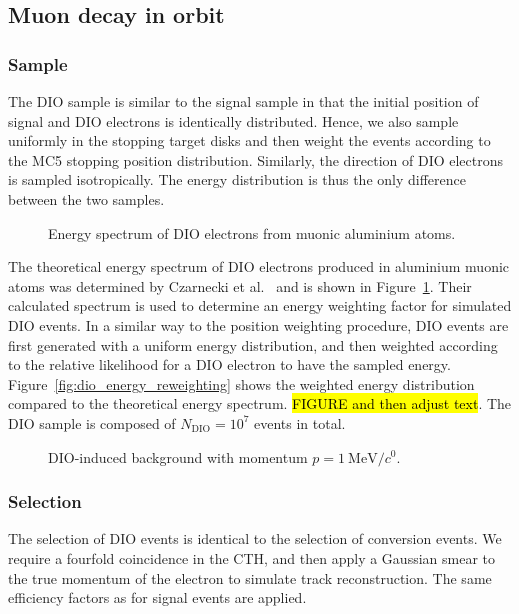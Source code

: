 \subsection{Muon decay in orbit}
\subsubsection{Sample}
The DIO sample is similar to the signal sample in that the initial position
of signal and DIO electrons is identically distributed. Hence, we also sample
uniformly in the stopping target disks and then weight the events according to
the MC5 stopping position distribution. Similarly, the direction of DIO
electrons is sampled isotropically. The energy distribution is thus the only
difference between the two samples. 

\begin{figure}
    \centering
    
    \caption{Energy spectrum of DIO electrons from muonic aluminium atoms.}
    \label{fig:czarnecki_spectrum}
\end{figure}

The theoretical energy spectrum of DIO electrons produced in aluminium muonic
atoms was determined by Czarnecki et al.~\cite{czarnecki} and is shown in
Figure~\ref{fig:czarnecki_spectrum}. Their calculated spectrum is used to
determine an energy weighting factor for simulated DIO events. In a similar way
to the position weighting procedure, DIO events are first generated with a
uniform energy distribution, and then weighted according to the relative
likelihood for a DIO electron to have the sampled energy.
Figure~\ref{fig:dio_energy_reweighting} shows the weighted energy distribution
compared to the theoretical energy spectrum. \hl{FIGURE and then adjust text}.
The DIO sample is composed of $N_\mathrm{DIO} = 10^7$ events in total.

\begin{figure}
    \centering
    
    \caption{DIO-induced background with momentum  $p=\SI{1}{\MeV/\clight}$.}
    \label{fig:muon_dio_in_cydet}
\end{figure}

\subsubsection{Selection}
The selection of DIO events is identical to the selection of conversion events.
We require a fourfold coincidence in the CTH, and then apply a Gaussian smear to
the true momentum of the electron to simulate track reconstruction. The same
efficiency factors as for signal events are applied.

